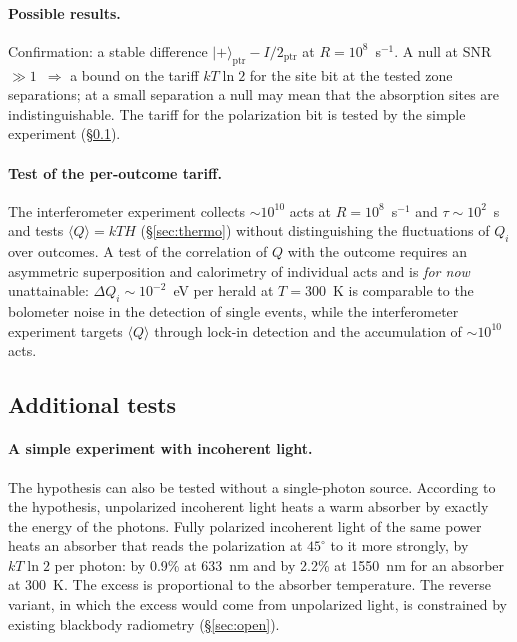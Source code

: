\documentclass[11pt,a4paper]{article}
\newcommand{\Sref}[1]{\hyperref[#1]{\S\ref{#1}}}
\begin{document}
\paragraph{Possible results.}
Confirmation: a stable difference $|{+}\rangle_{\mathrm{ptr}} - I/2_{\mathrm{ptr}}$ at $R=10^{8}$~s$^{-1}$. A null at SNR $\gg 1$~$\Rightarrow$ a bound on the tariff $kT\ln 2$ for the site bit at the tested zone separations; at a small separation a null may mean that the absorption sites are indistinguishable. The tariff for the polarization bit is tested by the simple experiment (\Sref{sec:extra}).

\paragraph{Test of the per-outcome tariff.}
The interferometer experiment collects $\sim 10^{10}$ acts at $R=10^{8}$~s$^{-1}$ and $\tau\sim 10^{2}$~s and tests $\langle Q\rangle = kT H$ (\Sref{sec:thermo}) without distinguishing the fluctuations of $Q_i$ over outcomes. A test of the correlation of $Q$ with the outcome requires an asymmetric superposition and calorimetry of individual acts and is \emph{for now} unattainable: $\Delta Q_i \sim 10^{-2}$~eV per herald at $T=300$~K is comparable to the bolometer noise in the detection of single events, while the interferometer experiment targets $\langle Q\rangle$ through lock-in detection and the accumulation of $\sim 10^{10}$ acts.

\subsection{Additional tests}\label{sec:extra}

\paragraph{A simple experiment with incoherent light.}
The hypothesis can also be tested without a single-photon source. According to the hypothesis, unpolarized incoherent light heats a warm absorber by exactly the energy of the photons. Fully polarized incoherent light of the same power heats an absorber that reads the polarization at $45^\circ$ to it more strongly, by $kT\ln 2$ per photon: by 0.9\% at 633~nm and by 2.2\% at 1550~nm for an absorber at 300~K. The excess is proportional to the absorber temperature. The reverse variant, in which the excess would come from unpolarized light, is constrained by existing blackbody radiometry (\Sref{sec:open}).
\end{document}
